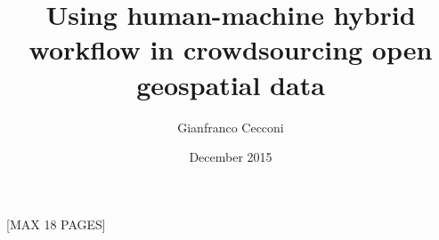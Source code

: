 \documentclass{llncs}
\title{Using human-machine hybrid workflow in crowdsourcing open geospatial data}
\author{Gianfranco Cecconi}
\institute{University of Southampton \email{gc1a13@soton.ac.uk}}
\date{December 2015}
\begin{document}
\maketitle

[MAX 18 PAGES]









\end{document}
